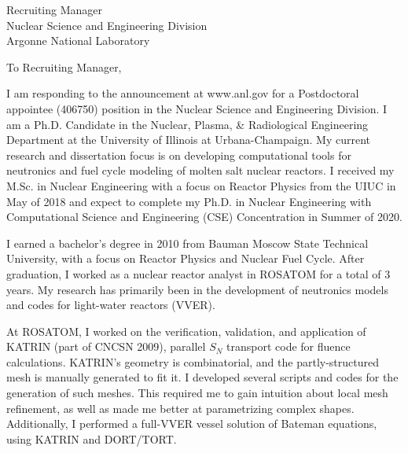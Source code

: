 \documentclass[11pt]{letter} %
\newcommand{\RecipientName}{Recruiting Manager\xspace}
\newcommand{\RecipientAddress}{Nuclear Science and Engineering Division \\
Argonne National Laboratory}
\begin{document}
\begin{letter}{\RecipientName\\
        \RecipientAddress\xspace}

\address{Andrei Rykhlevskii\\
andreir2@illinois.edu\\
226 Talbot Laboratory\\
104 Wright Street\\
Urbana, IL 61801}


\opening{To \RecipientName,}

I am responding to the announcement at www.anl.gov for a Postdoctoral 
appointee 
(406750) position in the Nuclear Science and Engineering Division. I am a 
Ph.D. Candidate in the Nuclear, Plasma, \& Radiological Engineering Department 
at the University of Illinois at Urbana-Champaign. My current research and 
dissertation focus is on developing computational tools for neutronics and 
fuel cycle modeling of molten salt nuclear reactors.  I received my M.Sc. in 
Nuclear Engineering with a focus on Reactor Physics from the UIUC in May of 
2018 and expect to complete my Ph.D. in Nuclear Engineering with Computational 
Science and Engineering (CSE) Concentration in Summer of 2020.

I earned a bachelor’s degree in 2010 from Bauman Moscow State Technical 
University, with a focus on Reactor Physics and Nuclear Fuel Cycle. After 
graduation, I worked as a nuclear reactor analyst in ROSATOM for a total of 3 
years. My research has primarily been in the development of neutronics models 
and codes for light-water reactors (VVER).

At ROSATOM, I worked on the verification, validation, and application of 
KATRIN (part of CNCSN 2009),  parallel $S_N$ transport code for fluence 
calculations. KATRIN’s geometry is combinatorial, and the partly-structured 
mesh is manually generated to fit it. I developed several scripts and codes 
for the generation of such meshes. This required me to gain intuition about 
local mesh refinement, as well as  made me better at parametrizing complex 
shapes. Additionally, I performed a full-VVER vessel solution of Bateman 
equations, using KATRIN and DORT/TORT.


\end{letter}
\end{document}

